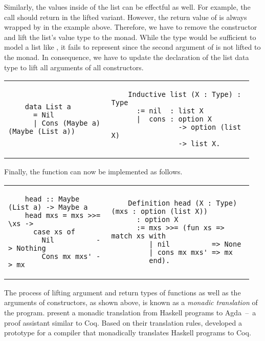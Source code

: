 Similarly, the values inside of the list can be effectful as well.
For example, the call  should return  in the lifted variant.
However, the return value of  is always wrapped by  in the example above.
Therefore, we have to remove the  constructor and lift the list's value type to the  monad.
While the type  would be sufficient to model a list like \haskell{[1, undefined, 2]}, it fails to represent  since the second argument of \haskell{(:)} is not lifted to the  monad.
In consequence, we have to update the declaration of the list data type to lift all arguments of all constructors.

\begin{tabular}{p{0.40\linewidth} | p{0.55\linewidth}}
  \begin{verbatim}
    data List a
      = Nil
      | Cons (Maybe a) (Maybe (List a))
  \end{verbatim}
  &
  \begin{verbatim}
    Inductive list (X : Type) : Type
      := nil  : list X
      |  cons : option X
                -> option (list X)
                -> list X.
  \end{verbatim}
\end{tabular}

Finally, the  function can now be implemented as follows.

\begin{tabular}{p{0.40\linewidth} | p{0.55\linewidth}}
  \begin{verbatim}
    head :: Maybe (List a) -> Maybe a
    head mxs = mxs >>= \xs ->
      case xs of
        Nil          -> Nothing
        Cons mx mxs' -> mx
  \end{verbatim}
  &
  \begin{verbatim}
    Definition head (X : Type) (mxs : option (list X))
      : option X
      := mxs >>= (fun xs => match xs with
         | nil          => None
         | cons mx mxs' => mx
         end).
  \end{verbatim}
\end{tabular}

The process of lifting argument and return types of functions as well as the arguments of constructors, as shown above, is known as a \textit{monadic translation} of the program.
\cite{Abel:2005} present a monadic translation from Haskell programs to Agda~--~a proof assistant similar to Coq.
Based on their translation rules, \cite{Jessen:2019} developed a prototype for a compiler that monadically translates Haskell programs to Coq.

